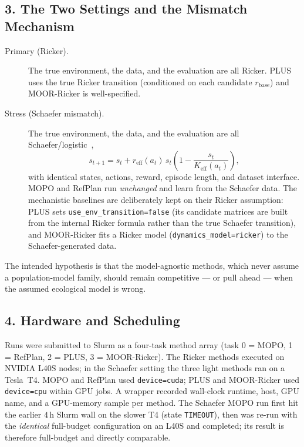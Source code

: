 \documentclass[11pt]{article}
\newcommand{\reff}{r_{\mathrm{eff}}}
\newcommand{\Keff}{K_{\mathrm{eff}}}
\newcommand{\rbase}{r_{\mathrm{base}}}
\begin{document}
\subsection*{3. The Two Settings and the Mismatch Mechanism}
\begin{description}
    \item[Primary (Ricker).] The true environment, the data, and the evaluation
    are all Ricker. PLUS uses the true Ricker transition (conditioned on each
    candidate $\rbase$) and MOOR-Ricker is well-specified.
    \item[Stress (Schaefer mismatch).] The true environment, the data, and the
    evaluation are all Schaefer/logistic~\cite{schaefer1954},
    \[
        s_{t+1} = s_t + \reff(a_t)\, s_t \left(1 - \frac{s_t}{\Keff(a_t)}\right),
    \]
    with identical states, actions, reward, episode length, and dataset interface.
    MOPO and RefPlan run \emph{unchanged} and learn from the Schaefer data. The
    mechanistic baselines are deliberately kept on their Ricker assumption: PLUS
    sets \texttt{use\_env\_transition=false} (its candidate matrices are built from
    the internal Ricker formula rather than the true Schaefer transition), and
    MOOR-Ricker fits a Ricker model (\texttt{dynamics\_model=ricker}) to the
    Schaefer-generated data.
\end{description}
The intended hypothesis is that the model-agnostic methods, which never assume a
population-model family, should remain competitive --- or pull ahead --- when the
assumed ecological model is wrong.

\subsection*{4. Hardware and Scheduling}
Runs were submitted to Slurm as a four-task method array (task 0 = MOPO,
1 = RefPlan, 2 = PLUS, 3 = MOOR-Ricker). The Ricker methods executed on NVIDIA
L40S nodes; in the Schaefer setting the three light methods ran on a Tesla~T4.
MOPO and RefPlan used \texttt{device=cuda}; PLUS and MOOR-Ricker used
\texttt{device=cpu} within GPU jobs. A wrapper recorded wall-clock runtime, host,
GPU name, and a GPU-memory sample per method. The Schaefer MOPO run first hit the
earlier $4$\,h Slurm wall on the slower T4 (state \texttt{TIMEOUT}), then was
re-run with the \emph{identical} full-budget configuration on an L40S and
completed; its result is therefore full-budget and directly comparable.
\end{document}

